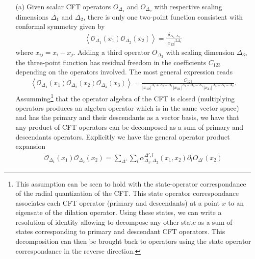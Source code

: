 \documentclass[10pt, a4paper]{article}
\begin{document}
{\begin{enumerate}
  \item[(a)] Given scalar CFT operators $O_{\Delta_1}$ and $O_{\Delta_2}$ with respective scaling dimensions $\Delta_1$ and $\Delta_2$, there is only one two-point function consistent with conformal symmetry given by 
  \begin{align*}
    \left\langle\mathcal{O}_{\Delta_1}(x_1) \mathcal{O}_{\Delta_2}(x_2)\right\rangle=\frac{\delta_{\Delta_1, \Delta_2}}{|x_{12}|^{2 \Delta_1}}
  \end{align*}
  where $x_{ij} = x_i - x_j$. Adding a third operator $O_{\Delta_3}$ with scaling dimension $\Delta_3$, the three-point function has residual freedom in the coefficients $C_{123}$ depending on the operators involved. The most general expression reads 
  \begin{align*}
    \left\langle\mathcal{O}_{\Delta_1}\left(x_1\right) \mathcal{O}_{\Delta_2}\left(x_2\right) \mathcal{O}_{\Delta_3}\left(x_3\right)\right\rangle=\frac{C_{123}}{|x_{12}|^{\Delta_1+\Delta_2-\Delta_3} |x_{23}|^{\Delta_2+\Delta_3-\Delta_1} |x_{31}|^{\Delta_3+\Delta_1-\Delta_2}}.
  \end{align*}
  Assumming\footnote{This assumption can be seen to hold with the state-operator correspondance of the radial quantization of the CFT. This state operator correspondance associates each CFT operator (primary and descendants) at a point $x$ to an eigensate of the dilation operator. Using these states, we can write a resolution of identity allowing to decompose any other state as a sum of states corresponding to primary and descendant CFT operators. This decomposition can then be brought back to operators using the state operator correspondance in the reverse direction.} that the operator algebra of the CFT is closed (multiplying operators produces an algebra operator which is in the same vector space) and has the primary and their descendants as a vector basis, we have that any product of CFT operators can be decomposed as a sum of primary and descendants operators. Explicitly we have the general operator product expansion
  \begin{align*}
    \mathcal{O}_{\Delta_1}\left(x_1\right) \mathcal{O}_{\Delta_2}\left(x_2\right) = \sum_{\Delta'} \sum_l \alpha^{\Delta', l}_{\Delta_1, \Delta_2} (x_{1}, x_{2}) \partial_{l} O_{\Delta'}(x_2)
  \end{align*}

\end{enumerate}}
\end{document}
